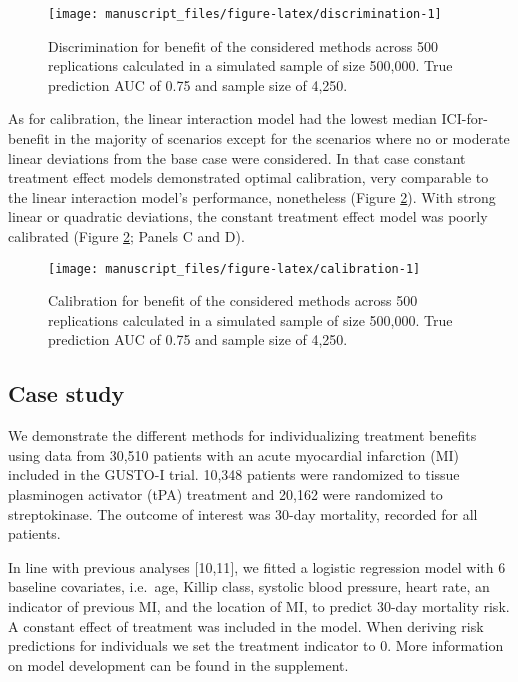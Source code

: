 \documentclass{article}
\begin{document}
\begin{figure}
\texttt{[image: manuscript\_files/figure-latex/discrimination-1]} \caption{Discrimination for benefit of the considered methods across 500 replications calculated in a simulated sample of size 500,000. True prediction AUC of 0.75 and sample size of 4,250.}\label{fig:discrimination}
\end{figure}

As for calibration, the linear interaction model had the lowest median
ICI-for-benefit in the majority of scenarios except for the scenarios
where no or moderate linear deviations from the base case were
considered. In that case constant treatment effect models demonstrated
optimal calibration, very comparable to the linear interaction model's
performance, nonetheless (Figure \ref{fig:calibration}). With strong
linear or quadratic deviations, the constant treatment effect model was
poorly calibrated (Figure \ref{fig:calibration}; Panels C and D).

\begin{figure}
\texttt{[image: manuscript\_files/figure-latex/calibration-1]} \caption{Calibration for benefit of the considered methods across 500 replications calculated in a simulated sample of size 500,000. True prediction AUC of 0.75 and sample size of 4,250.}\label{fig:calibration}
\end{figure}

\hypertarget{case-study}{%
\subsection{Case study}\label{case-study}}

We demonstrate the different methods for individualizing treatment
benefits using data from 30,510 patients with an acute myocardial
infarction (MI) included in the GUSTO-I trial. 10,348 patients were
randomized to tissue plasminogen activator (tPA) treatment and 20,162
were randomized to streptokinase. The outcome of interest was 30-day
mortality, recorded for all patients.

In line with previous analyses {[}10,11{]}, we fitted a logistic
regression model with 6 baseline covariates, i.e.~age, Killip class,
systolic blood pressure, heart rate, an indicator of previous MI, and
the location of MI, to predict 30-day mortality risk. A constant effect
of treatment was included in the model. When deriving risk predictions
for individuals we set the treatment indicator to 0. More information on
model development can be found in the supplement.
\end{document}
